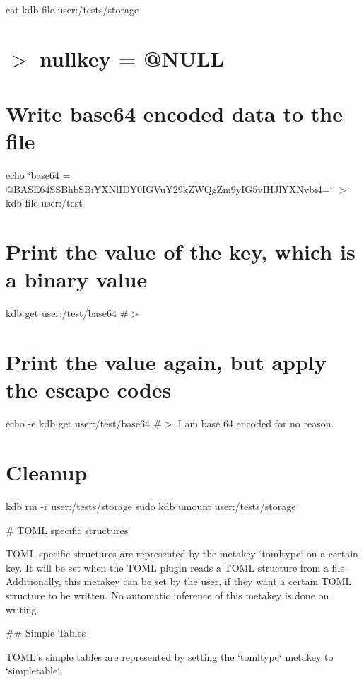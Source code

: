 cat {\ttfamily kdb file user\+:/tests/storage} \hypertarget{autotoc_md642_autotoc_md701}{}\section{$>$ nullkey = \textquotesingle{}@\+N\+U\+L\+L\textquotesingle{}}\label{autotoc_md642_autotoc_md701}
\hypertarget{autotoc_md642_autotoc_md702}{}\section{Write base64 encoded data to the file}\label{autotoc_md642_autotoc_md702}
echo \char`\"{}base64 = \textquotesingle{}@\+B\+A\+S\+E64\+S\+S\+Bhb\+S\+Bi\+Y\+X\+Nl\+I\+D\+Y0\+I\+G\+Vu\+Y29k\+Z\+W\+Qg\+Zm9y\+I\+G5v\+I\+H\+Jl\+Y\+X\+Nvbi4=\textquotesingle{}\char`\"{} $>$ {\ttfamily kdb file user\+:/test}\hypertarget{autotoc_md642_autotoc_md703}{}\section{Print the value of the key, which is a binary value}\label{autotoc_md642_autotoc_md703}
kdb get \textquotesingle{}user\+:/test/base64\textquotesingle{} \#$>$ \hypertarget{autotoc_md642_autotoc_md704}{}\section{Print the value again, but apply the escape codes}\label{autotoc_md642_autotoc_md704}
echo -\/e {\ttfamily kdb get \textquotesingle{}user\+:/test/base64\textquotesingle{}} \#$>$ I am base 64 encoded for no reason.\hypertarget{autotoc_md642_autotoc_md705}{}\section{Cleanup}\label{autotoc_md642_autotoc_md705}
kdb rm -\/r user\+:/tests/storage sudo kdb umount user\+:/tests/storage 
\begin{DoxyCode}
# TOML specific structures

TOML specific structures are represented by the metakey `tomltype` on a certain key.
It will be set when the TOML plugin reads a TOML structure from a file. Additionally, this metakey can be
       set by the user, if they want a certain TOML structure to be written.
No automatic inference of this metakey is done on writing.

## Simple Tables

TOML's simple tables are represented by setting the `tomltype` metakey to `simpletable`.
\end{DoxyCode}
